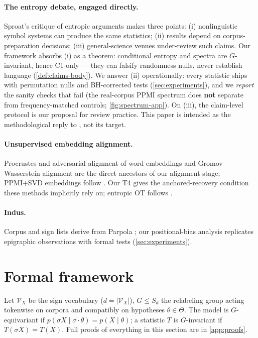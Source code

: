\documentclass[10pt,twocolumn]{article}
\newcommand{\Cone}{\textsf{C1}}
\begin{document}
\paragraph{The entropy debate, engaged directly.}
Sproat's critique \cite{sproat2010,farmer2004} of entropic arguments
\cite{rao2009,rao2010reply} makes three points: (i) nonlinguistic
symbol systems can produce the same statistics; (ii) results depend on
corpus-preparation decisions; (iii) general-science venues under-review
such claims. Our framework absorbs (i) as a theorem: conditional
entropy and spectra are $G$-invariant, hence \Cone-only --- they can
falsify randomness nulls, never establish language
(\cref{def:claims-body}). We answer (ii) operationally: every
statistic ships with permutation nulls and BH-corrected tests
(\cref{sec:experiments}), and we \emph{report} the sanity checks that
fail (the real-corpus PPMI spectrum does \textbf{not} separate from
frequency-matched controls; \cref{fig:spectrum-app}). On (iii), the
claim-level protocol is our proposal for review practice. This paper is
intended as the methodological reply to \cite{sproat2010}, not its
target.

\paragraph{Unsupervised embedding alignment.} Procrustes and
adversarial alignment of word embeddings \cite{conneau2018,artetxe2018}
and Gromov--Wasserstein alignment \cite{alvarezmelis2018,memoli2011}
are the direct ancestors of our alignment stage; PPMI+SVD embeddings
follow \cite{levy2014}. Our T4 gives the anchored-recovery condition
these methods implicitly rely on; entropic OT follows
\cite{cuturi2013}.

\paragraph{Indus.} Corpus and sign lists derive from Parpola
\cite{parpola1994}; our positional-bias analysis replicates
epigraphic observations with formal tests
(\cref{sec:experiments}).

\section{Formal framework}
\label{sec:framework}

Let $\mathcal{V}_X$ be the sign vocabulary ($d=|\mathcal{V}_X|$), $G\le
S_d$ the relabeling group acting tokenwise on corpora and compatibly on
hypotheses $\theta\in\Theta$. The model is $G$-equivariant if
$p(\sigma X\mid\sigma\cdot\theta)=p(X\mid\theta)$; a statistic $T$ is
$G$-invariant if $T(\sigma X)=T(X)$. Full proofs of everything in this
section are in \cref{app:proofs}.
\end{document}
